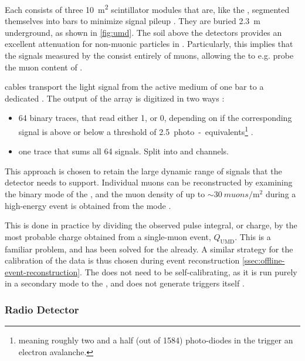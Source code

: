 Each \UMD consists of three \SI{10}{\meter\squared} scintillator modules that 
are, like the \SSD, segmented themselves into bars to minimize signal pileup
\cite{bottiStatusPerformanceUnderground2022}. They are buried \SI{2.3}{\meter} 
underground, as shown in \cref{fig:umd}. The soil above the detectors provides 
an excellent attenuation for non-muonic particles in \EASs. Particularly, this 
implies that the signals measured by the \UMD consist entirely of muons, 
allowing the \PAO to e.g. probe the muon content of \EASs {}.

\WLS cables transport the light signal from the active medium of one bar to a 
dedicated \SiPM. The output of the \SiPM array is digitized in two ways 
\cite{aabCalibrationUndergroundMuon2021}:

\begin{itemize}
	\item 64 binary traces, that read either 1, or 0, depending on if the 
	corresponding \SiPM signal is above or below a threshold of 
	\SI{2.5}{photo-equivalents}\footnote{meaning roughly two and a half
	(out of 1584) photo-diodes in the \SiPM trigger an electron avalanche.}
	\cite{bottiStatusPerformanceUnderground2022}.
	\item one \ADC trace that sums all 64 \SiPM signals. Split into \HG and
	\LG channels.
\end{itemize}

This approach is chosen to retain the large dynamic range of signals that the 
detector needs to support. Individual muons can be reconstructed by examining
the binary mode of the \UMD, and the muon density of up to 
$\sim\SI{30}{muons\per\meter\squared} $ during a high-energy \EAS event is 
obtained from the \ADC mode \cite{bottiStatusPerformanceUnderground2022}.

This is done in practice by dividing the observed pulse integral, or charge, by
the most probable charge obtained from a single-muon event, $Q_\mathrm{UMD}$. 
This is a familiar problem, and has been solved for the \WCD already. A similar
strategy for the calibration of the \UMD \EAS data is thus chosen during event 
reconstruction \cref{ssec:offline-event-reconstruction}. The \UMD does not need
to be self-calibrating, as it is run purely in a secondary mode to the \WCD, 
and does not generate triggers itself \cite{aabCalibrationUndergroundMuon2021}.

\subsubsection{Radio Detector}
\label{sssec:rd}

